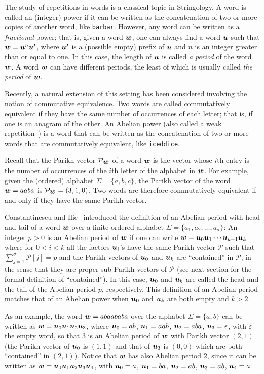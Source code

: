 \documentclass[3p]{elsarticle}
\def\sa#1{\mbox{\tt #1}}
\def\PV{\mathcal{P}}
\def\PVW{\mathcal{P}_{\s{w}}}
\def\s#1{\mbox{\boldmath $#1$}}
\begin{document}
The study of repetitions in words is a classical topic in Stringology. A word is called an (integer) power if it can be written as the concatenation of two or more copies of another word, like \sa{barbar}. However, any word can be written as a \emph{fractional} power; that is, given a word $\s{w}$, one can always find a word $\s{u}$ such that $\s{w}=\s{u}^{n}\s{u'}$, where $\s{u'}$ is a (possible empty) prefix of $\s{u}$ and $n$ is an integer greater than or equal to one. In this case, the length of $\s{u}$ is called \emph{a period} of the word $\s{w}$. A word $\s{w}$ can have different periods, the least of which is usually called \emph{the period} of $\s{w}$.

Recently, a natural extension of this setting has been considered involving the notion of commutative equivalence. Two words are called commutatively equivalent if they have the same number of occurrences of each letter; that is, if one is an anagram of the other. An Abelian power (also called a weak repetition~\cite{Cummings_weakrepetitions}) is a word that can be written as the concatenation of two or more words that are commutatively equivalent, like  \sa{iceddice}.

Recall that the Parikh vector $\PVW$ of a word $\s{w}$ is the vector whose $i$th entry is the 
 number of occurrences of the $i$th letter of the alphabet in $\s{w}$. 
 For example, given the (ordered) alphabet $\Sigma=\{a,b,c\}$, the Parikh vector
 of the word $\s{w}=aaba$ is $\PVW=(3,1,0)$. Two words are therefore commutatively equivalent if and only if they have the same Parikh vector.

Constantinescu and Ilie~\cite{CI2006} introduced the definition of an Abelian period with head and tail of a word $\s{w}$ over a
 finite ordered alphabet $\Sigma=\{a_{1},a_{2},\ldots , a_{\sigma}\}$: An integer $p>0$ is an Abelian period of $\s{w}$  if one can write
 $\s{w}=\s{u}_0\s{u}_1 \cdots \s{u}_{k-1}\s{u}_k$ where for $0<i<k$
 all the factors $\s{u}_i$'s have the same Parikh vector $\PV$ such that
 $\sum_{j=1}^{\sigma}\PV[j]=p$
 and the Parikh vectors of $\s{u}_0$ and $\s{u}_k$ are ``contained''
 in $\PV$, in the sense that they are proper sub-Parikh vectors of $\PV$ (see next section for the formal definition of ``contained''). In this case, $\s{u}_0$ and $\s{u}_k$ are called the head and the tail of the Abelian period $p$, respectively. 
This definition of an Abelian period matches that of an
Abelian power when $\s{u}_0$ and $\s{u}_k$ are both  empty  and
 $k>2$.
 
 As an example, the word $\s{w}=abaababa$ over the alphabet $\Sigma=\{a,b\}$ can be written as
 $\s{w}=\s{u}_{0}\s{u}_{1}\s{u}_{2}\s{u}_{3}$, where
 $\s{u}_{0}=ab$, $\s{u}_{1}=aab$, $\s{u}_{2}=aba$, $\s{u}_{3}=\varepsilon$, with $\varepsilon$ the empty word,
 so that $3$ is an Abelian period of $\s{w}$ with Parikh vector $(2,1)$
 (the Parikh vector of $\s{u}_{0}$ is $(1,1)$ and that of $\s{u}_{3}$
 is $(0,0)$ which are both ``contained'' in $(2,1)$). Notice that $\s{w}$ has also Abelian period $2$, since it can be written as $\s{w}=\s{u}_{0}\s{u}_{1}\s{u}_{2}\s{u}_{3}\s{u}_{4}$, with $\s{u}_{0}=a$, $\s{u}_{1}=ba$, $\s{u}_{2}=ab$, $\s{u}_{3}=ab$, $\s{u}_{4}=a$.
\end{document}
